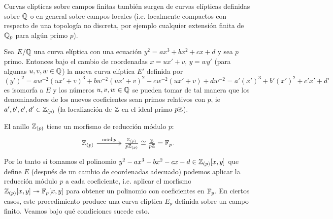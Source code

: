 \documentclass[../../tesis_maestria]{subfiles}
\begin{document}
Curvas el\'ipticas sobre campos finitas tambi\'en surgen de curvas el\'ipticas definidas sobre $\mathbb{Q}$
o en general sobre campos locales (i.e. localmente compactos con respecto de una topolog\'ia no
discreta, por ejemplo cualquier extensi\'on finita de $\mathbb{Q}_p$ para alg\'un primo $p$).

Sea $E/\mathbb{Q}$ una curva el\'iptica con una ecuaci\'on $y^2=ax^3+bx^2+cx+d$ y sea $p$ primo. Entonces
bajo el cambio de coordenadas $x=ux'+v$, $y=wy'$ (para algunas $u,v,w\in\mathbb{Q}$) la nueva curva
el\'iptica $E'$ definida por
\[
  (y')^2=aw^{-2}(ux'+v)^3+bw^{-2}(ux'+v)^2+cw^{-2}(ux'+v)+dw^{-2}=a'(x')^3+b'(x')^2+c'x'+d'
\]
es isomorfa a $E$ y los n\'umeros $u,v,w\in\mathbb{Q}$ se pueden tomar de tal manera que los denominadores
de los nuevos coeficientes sean primos relativos con $p$, ie $a',b',c',d'\in\mathbb{Z}_{(p)}$ (la
localizaci\'on de $\mathbb{Z}$ en el ideal primo $p\mathbb{Z}$). %

El anillo $\mathbb{Z}_{(p)}$ tiene un morfismo de reducci\'on m\'odulo $p$:
\[
  \begin{tikzcd}[column sep=large]
    \ZZ_{(p)} \arrow[r,two heads,"\mathrm{mod}\,p"] &
    \frac{\ZZ_{(p)}}{p\ZZ_{(p)}}\cong\frac{\ZZ}{p\ZZ}=\FF_p.
  \end{tikzcd}
\]
Por lo tanto si tomamos el polinomio $y^2-ax^3-bx^2-cx-d\in\mathbb{Z}_{(p)}[x,y]$ que define $E$
(despu\'es de un cambio de coordenadas adecuado) podemos aplicar la reducci\'on m\'odulo $p$ a cada
coeficiente, i.e. aplicar el morfismo $\mathbb{Z}_{(p)}[x,y]\twoheadrightarrow\mathbb{F}_p[x,y]$ para obtener un polinomio con
coeficientes en $\mathbb{F}_p$. En ciertos casos, este procedimiento produce una curva el\'iptica $E_p$
definida sobre un campo finito. Veamos bajo qu\'e condiciones sucede esto.
\end{document}

